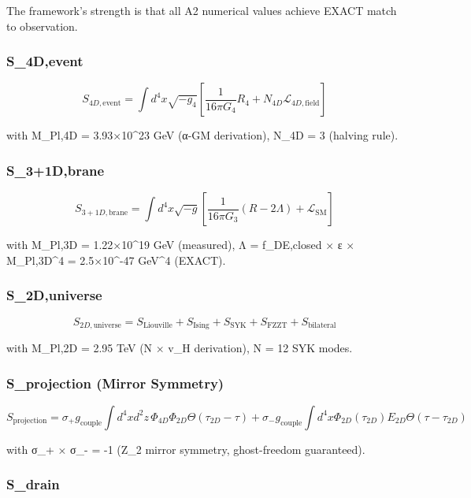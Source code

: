 \documentclass[11pt,a4paper]{article}
\begin{document}
The framework's strength is that all A2 numerical values achieve EXACT
match to observation.

\hypertarget{s_4devent}{%
\subsubsection{S\_4D,event}\label{s_4devent}}

\[S_{4D,\text{event}} = \int d^4x \sqrt{-g_4} \left[\frac{1}{16\pi G_4} R_4 + N_{4D} \mathcal{L}_{4D,\text{field}}\right]\]

with M\_Pl,4D = 3.93×10\^{}23 GeV (α-GM derivation), N\_4D = 3 (halving
rule).

\hypertarget{s_31dbrane}{%
\subsubsection{S\_3+1D,brane}\label{s_31dbrane}}

\[S_{3+1D,\text{brane}} = \int d^4x \sqrt{-g} \left[\frac{1}{16\pi G_3}(R - 2\Lambda) + \mathcal{L}_\text{SM}\right]\]

with M\_Pl,3D = 1.22×10\^{}19 GeV (measured), Λ = f\_DE,closed × ε ×
M\_Pl,3D\^{}4 = 2.5×10\^{}-47 GeV\^{}4 (EXACT).

\hypertarget{s_2duniverse}{%
\subsubsection{S\_2D,universe}\label{s_2duniverse}}

\[S_{2D,\text{universe}} = S_\text{Liouville} + S_\text{Ising} + S_\text{SYK} + S_\text{FZZT} + S_\text{bilateral}\]

with M\_Pl,2D = 2.95 TeV (N × v\_H derivation), N = 12 SYK modes.

\hypertarget{s_projection-mirror-symmetry}{%
\subsubsection{S\_projection (Mirror
Symmetry)}\label{s_projection-mirror-symmetry}}

\[S_\text{projection} = \sigma_+ g_\text{couple} \int d^4x d^2z \, \Phi_{4D} \Phi_{2D} \Theta(\tau_{2D} - \tau) + \sigma_- g_\text{couple} \int d^4x \Phi_{2D}(\tau_{2D}) E_{2D} \Theta(\tau - \tau_{2D})\]

with σ\_+ × σ\_- = -1 (Z\_2 mirror symmetry, ghost-freedom guaranteed).

\hypertarget{s_drain}{%
\subsubsection{S\_drain}\label{s_drain}}
\end{document}
